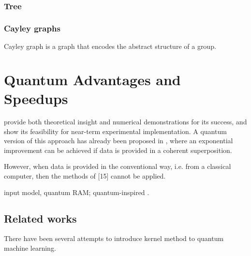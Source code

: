 \subsubsection{Tree}

\subsubsection{Cayley graphs}
\begin{definition}\label{def:cayley_graph}
	Cayley graph is a graph that encodes the abstract structure of a group. 
\end{definition}

\section{Quantum Advantages and Speedups}\label{sec:speedup}
provide both theoretical insight and numerical demonstrations for its success, and show its feasibility for near-term experimental implementation.
A quantum version of this approach has already been proposed in \cite{rebentrostQuantumSupportVector2014},
where an exponential improvement can be achieved if data is provided in a coherent superposition. 
\begin{remark}
	However, when data is provided in the conventional way, i.e. from a classical computer, then the methods of [15] cannot be applied.
\end{remark}
input model, quantum RAM;
quantum-inspired \cite{tangQuantuminspiredClassicalAlgorithm2019}
\cite{tangQuantumPrincipalComponent2021}.

\subsection{Related works}\label{sec:qke}
There have been several attempts to introduce kernel method to quantum machine learning.

